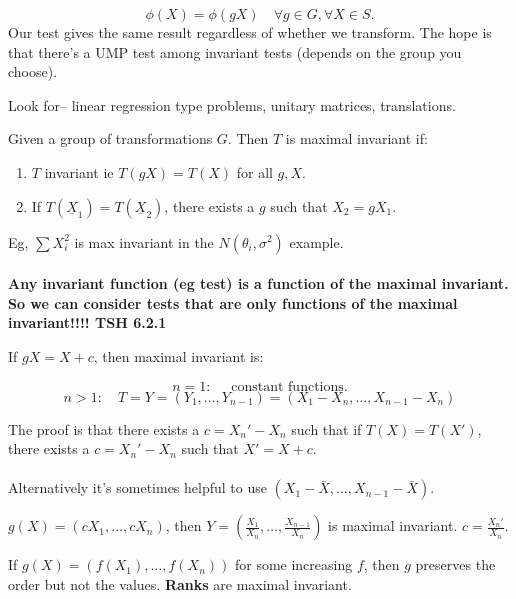 \documentclass{article}
\begin{document}
\begin{definition}
$$\phi(X) = \phi(gX) \quad \forall g\in G , \forall X\in S.$$
Our test gives the same result regardless of whether we transform. The hope is that there's a UMP test among invariant tests (depends on the group you choose). 
\end{definition}

Look for-- linear regression type problems, unitary matrices, translations. 

\begin{definition}
Given a group of transformations $G$. Then $T$ is maximal invariant if:
\begin{enumerate}
	\item $T$ invariant ie $T(gX) = T(X)$ for all $g,X$. 
	\item If $T(\underline X_1) = T(\underline X_2)$, there exists a $g$ such that $X_2 = gX_1$. 
\end{enumerate}
Eg, $\sum X_i^2$ is max invariant in the $N(\theta_i,\sigma^2)$ example. \\\\
\textbf{Any invariant function (eg test) is a function of the maximal invariant. So we can consider tests that are only functions of the maximal invariant!!!! TSH 6.2.1}
\end{definition}

\begin{example}
If $g X = X + c$, then maximal invariant is:

$$n = 1: \quad \text{ constant functions}.$$
$$n>1: \quad T = Y = (Y_1,\ldots, Y_{n-1}) = (X_1 - X_n,\ldots, X_{n-1} - X_n)$$

The proof is that there exists a $c = X_n' - X_n$ such that if $T(X) = T(X')$, there exists a $c = X_n' - X_n$ such that $X ' = X + c$.  \\\\

Alternatively it's sometimes helpful to use $(X_1 - \bar X, \ldots, X_{n-1} - \bar{X})$. 
\end{example}

\begin{example}
$g(X) = (cX_1,\ldots, cX_n)$, then $Y= (\frac{X_1}{X_n},\ldots, \frac{X_{n-1}}{X_n})$ is maximal invariant. $c = \frac{X_n'}{X_n}$. 
\end{example}

\begin{example}
If $g(X) = (f(X_1),\ldots, f(X_n))$ for some increasing $f$, then $g$ preserves the order but not the values. \textbf{Ranks} are maximal invariant. 
\end{example}
\end{document}

